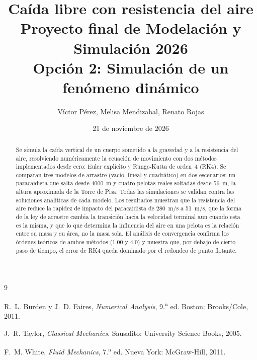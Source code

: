 \documentclass[12pt,letterpaper]{article}
\title{Caída libre con resistencia del aire\\[0.3em]
\large Proyecto final de Modelación y Simulación 2026\\
Opción 2: Simulación de un fenómeno dinámico}
\author{Víctor Pérez, Melisa Mendizabal, Renato Rojas}
\date{21 de noviembre de 2026}
\begin{document}
\maketitle

\begin{abstract}
Se simula la caída vertical de un cuerpo sometido a la gravedad y a la resistencia del aire, resolviendo numéricamente la ecuación de movimiento con dos métodos implementados desde cero: Euler explícito y Runge-Kutta de orden~4 (RK4). Se comparan tres modelos de arrastre (vacío, lineal y cuadrático) en dos escenarios: un paracaidista que salta desde \qty{4000}{m} y cuatro pelotas reales soltadas desde \qty{56}{m}, la altura aproximada de la Torre de Pisa. Todas las simulaciones se validan contra las soluciones analíticas de cada modelo. Los resultados muestran que la resistencia del aire reduce la rapidez de impacto del paracaidista de \qty{280}{m/s} a \qty{51}{m/s}, que la forma de la ley de arrastre cambia la transición hacia la velocidad terminal aun cuando esta es la misma, y que lo que determina la influencia del aire en una pelota es la relación entre su masa y su área, no la masa sola. El análisis de convergencia confirma los órdenes teóricos de ambos métodos (1.00 y 4.0) y muestra que, por debajo de cierto paso de tiempo, el error de RK4 queda dominado por el redondeo de punto flotante.
\end{abstract}




\begin{thebibliography}{9}

R.~L. Burden y J.~D. Faires, \emph{Numerical Analysis}, 9.\textsuperscript{a} ed. Boston: Brooks/Cole, 2011.

J.~R. Taylor, \emph{Classical Mechanics}. Sausalito: University Science Books, 2005.

F.~M. White, \emph{Fluid Mechanics}, 7.\textsuperscript{a} ed. Nueva York: McGraw-Hill, 2011.

\end{thebibliography}

\appendix

\end{document}
